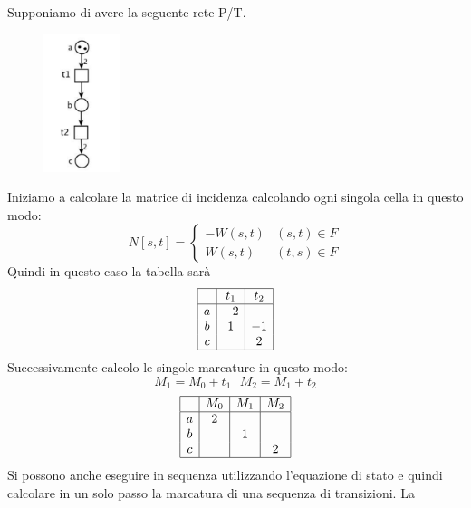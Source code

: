 \begin{esempio}
    Supponiamo di avere la seguente rete P/T.
    \begin{figure}
        \centering
        \includegraphics[width=0.2\textwidth]{img/reti/EsercizioP-T.png}
    \end{figure}
    Iniziamo a calcolare la matrice di incidenza calcolando ogni singola cella
    in questo modo:
    $$N[s,t]= \begin{cases}
            - W(s,t) & (s,t)\in F \\
            W(s,t)   & (t,s)\in F
        \end{cases}$$
    Quindi in questo caso la tabella sarà
    \begin{equation}
        \begin{array}{|c|c|c|}
            \hline
              & t_1 & t_2 \\
            \hline
            a & -2  &     \\
            b & 1   & -1  \\
            c &     & 2   \\
            \hline
        \end{array}
    \end{equation}
    Successivamente calcolo le singole marcature in questo modo:
    $$M_1 = M_0 + t_1 \ \ \ M_2 = M_1 + t_2 $$
    \begin{equation}
        \begin{array}{|c|c|c|c|}
            \hline
              & M_0 & M_1 & M_2 \\
            \hline
            a & 2   &     &     \\
            b &     & 1   &     \\
            c &     &     & 2   \\
            \hline
        \end{array}
    \end{equation}
    Si possono anche eseguire in sequenza utilizzando l'equazione di stato e quindi
    calcolare in un solo passo la marcatura di una sequenza di transizioni. La

\end{esempio}
